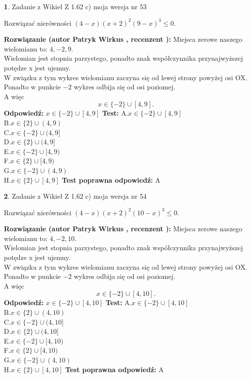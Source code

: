 \documentclass[12pt, a4paper]{article}
\theoremstyle{definition} %
\newtheorem{zad}{}
\newcommand{\zadStart}[1]{\begin{zad}#1\newline}
\newcommand{\zadStop}{\end{zad}}
\newcommand{\rozwStart}[2]{\noindent \textbf{Rozwiązanie (autor #1 , recenzent #2): }\newline}
\newcommand{\rozwStop}{\newline}
\newcommand{\odpStart}{\noindent \textbf{Odpowiedź:}\newline}
\newcommand{\odpStop}{\newline}
\newcommand{\testStart}{\noindent \textbf{Test:}\newline}
\newcommand{\testStop}{\newline}
\newcommand{\kluczStart}{\noindent \textbf{Test poprawna odpowiedź:}\newline}
\newcommand{\kluczStop}{\newline}
\begin{document}
\zadStart{Zadanie z Wikieł Z 1.62 c) moja wersja nr 53}

Rozwiązać nierówności $(4-x)(x+2)^{2}(9-x)^{3}\le0$.
\zadStop
\rozwStart{Patryk Wirkus}{}
Miejsca zerowe naszego wielomianu to: $4, -2, 9$.\\
Wielomian jest stopnia parzystego, ponadto znak współczynnika przy\linebreak najwyższej potędze x jest ujemny.\\ W związku z tym wykres wielomianu zaczyna się od lewej strony powyżej osi OX.\\
Ponadto w punkcie $-2$ wykres odbija się od osi poziomej.\\
A więc $$x \in \{-2\} \cup [4,9].$$
\rozwStop
\odpStart
$x \in \{-2\} \cup [4,9]$
\odpStop
\testStart
A.$x \in \{-2\} \cup [4,9]$\\
B.$x \in \{2\} \cup (4,9)$\\
C.$x \in \{-2\} \cup (4,9]$\\
D.$x \in \{2\} \cup (4,9]$\\
E.$x \in \{-2\} \cup [4,9)$\\
F.$x \in \{2\} \cup [4,9)$\\
G.$x \in \{-2\} \cup (4,9)$\\
H.$x \in \{2\} \cup [4,9]$
\testStop
\kluczStart
A
\kluczStop



\zadStart{Zadanie z Wikieł Z 1.62 c) moja wersja nr 54}

Rozwiązać nierówności $(4-x)(x+2)^{2}(10-x)^{3}\le0$.
\zadStop
\rozwStart{Patryk Wirkus}{}
Miejsca zerowe naszego wielomianu to: $4, -2, 10$.\\
Wielomian jest stopnia parzystego, ponadto znak współczynnika przy\linebreak najwyższej potędze x jest ujemny.\\ W związku z tym wykres wielomianu zaczyna się od lewej strony powyżej osi OX.\\
Ponadto w punkcie $-2$ wykres odbija się od osi poziomej.\\
A więc $$x \in \{-2\} \cup [4,10].$$
\rozwStop
\odpStart
$x \in \{-2\} \cup [4,10]$
\odpStop
\testStart
A.$x \in \{-2\} \cup [4,10]$\\
B.$x \in \{2\} \cup (4,10)$\\
C.$x \in \{-2\} \cup (4,10]$\\
D.$x \in \{2\} \cup (4,10]$\\
E.$x \in \{-2\} \cup [4,10)$\\
F.$x \in \{2\} \cup [4,10)$\\
G.$x \in \{-2\} \cup (4,10)$\\
H.$x \in \{2\} \cup [4,10]$
\testStop
\kluczStart
A
\kluczStop
\end{document}

